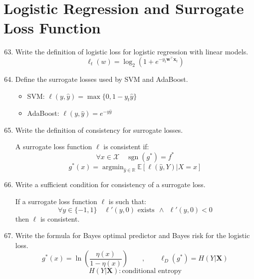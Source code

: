 \documentclass[a4paper]{article}
\newcommand{\X}{\ensuremath{\mathcal{X}}}
\newcommand{\E}{\ensuremath{\mathbb{E}}}
\newcommand{\RN}{\ensuremath{\mathbb{R}}}
\DeclareMathOperator*{\argmin}{argmin}
\DeclareMathOperator*{\sgn}{sgn}
\begin{document}
\section{Logistic Regression and Surrogate Loss Function}
\begin{enumerate}
    \setcounter{enumi}{62}
    \item Write the definition of logistic loss for logistic regression with linear models.
        $$\ell_t(w) = \log_2{(1+e^{-y_t\bm w^\top \bm x_t})}$$
    \item Define the surrogate losses used by SVM and AdaBoost.
    \begin{itemize}
        \item SVM: $\ell(y,\hat{y})=\max\{0,1-y_t\hat{y}\}$
        \item AdaBoost: $\ell(y,\hat{y})=e^{-y\hat{y}}$
    \end{itemize}
    \item Write the definition of consistency for surrogate losses.

        A surrogate loss function $\ell$ is consistent if:
        $$ \forall x\in\X \quad \sgn(g^*)=f^* $$
        $$ g^*(x)=\argmin_{\hat{y}\in\RN}\E[\ell(\hat{y},Y)|X=x] $$
    \item Write a sufficient condition for consistency of a surrogate loss.

        If a surrogate loss function $\ell$ is such that:
        $$ \forall y\in\{-1,1\} \quad \ell'(y,0)\text{ exists} 
        \ \ \wedge \ \ \ell'(y,0)<0 $$
        then $\ell$ is consistent.
    \item Write the formula for Bayes optimal predictor and Bayes risk for the logistic loss.
    $$ g^*(x)=\ln\left(\frac{\eta(x)}{1-\eta(x)}\right)
    \qquad , \qquad \ell_D(g^*)=H(Y|\bm X) $$
    $$ H(Y|\bm X): \text{conditional entropy} $$
\end{enumerate}
\end{document}
